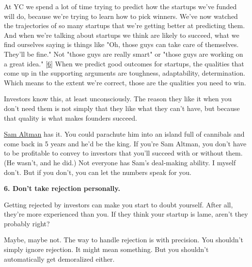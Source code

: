 At YC we spend a lot of time trying to
                    predict how the startups we've funded will do, because we're
                    trying to learn how to pick winners. We've now watched the
                    trajectories of so many startups that we're getting better
                    at predicting them. And when we're talking about startups we
                    think are likely to succeed, what we find ourselves saying
                    is things like "Oh, those guys can take care of themselves.
                    They'll be fine." Not "those guys are really smart" or
                    "those guys are working on a great idea."
                    [\href{\#f6n}{6}]
                    When we predict good outcomes for startups, the qualities
                    that come up in the supporting arguments are toughness,
                    adaptability, determination. Which means to the extent we're
                    correct, those are the qualities you need to win.

Investors
                    know this, at least unconsciously. The reason they like it
                    when you don't need them is not simply that they like what
                    they can't have, but because that quality is what makes
                    founders succeed.

\href{http://www.youtube.com/watch?v=KhhId\_WG7RA}{Sam Altman}
                    has it. You could parachute him into an island full of
                    cannibals and come back in 5 years and he'd be the king. If
                    you're Sam Altman, you don't have to be profitable to convey
                    to investors that you'll succeed with or without them. (He
                    wasn't, and he did.) Not everyone has Sam's deal-making
                    ability. I myself don't. But if you don't, you can let the
                    numbers speak for you.


                    \textbf{6. Don't take rejection personally.}

Getting rejected by investors can make you
                    start to doubt yourself. After all, they're more experienced
                    than you. If they think your startup is lame, aren't they
                    probably right?

Maybe, maybe not. The way to
                    handle rejection is with precision. You shouldn't simply
                    ignore rejection. It might mean something. But you shouldn't
                    automatically get demoralized either.

